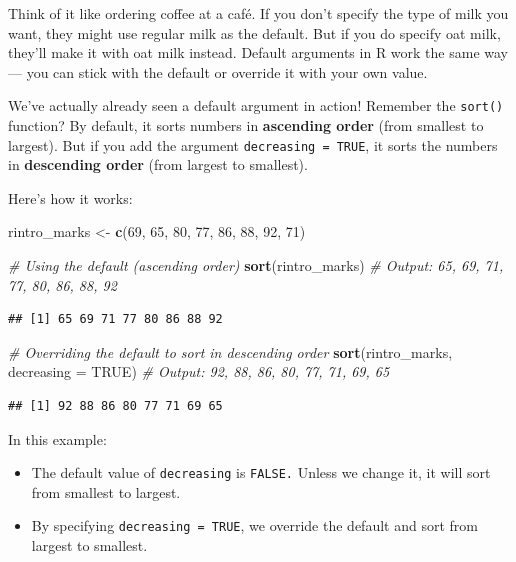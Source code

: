 \documentclass[
]{book}
\newenvironment{Shaded}{\begin{snugshade}}{\end{snugshade}}
\newcommand{\AttributeTok}[1]{\textcolor[rgb]{0.13,0.29,0.53}{#1}}
\newcommand{\CommentTok}[1]{\textcolor[rgb]{0.56,0.35,0.01}{\textit{#1}}}
\newcommand{\ConstantTok}[1]{\textcolor[rgb]{0.56,0.35,0.01}{#1}}
\newcommand{\DecValTok}[1]{\textcolor[rgb]{0.00,0.00,0.81}{#1}}
\newcommand{\FunctionTok}[1]{\textcolor[rgb]{0.13,0.29,0.53}{\textbf{#1}}}
\newcommand{\NormalTok}[1]{#1}
\newcommand{\OtherTok}[1]{\textcolor[rgb]{0.56,0.35,0.01}{#1}}
\begin{document}
Think of it like ordering coffee at a café. If you don't specify the type of milk you want, they might use regular milk as the default. But if you do specify oat milk, they'll make it with oat milk instead. Default arguments in R work the same way --- you can stick with the default or override it with your own value.

We've actually already seen a default argument in action! Remember the \texttt{sort()} function? By default, it sorts numbers in \textbf{ascending order} (from smallest to largest). But if you add the argument \texttt{decreasing\ =\ TRUE}, it sorts the numbers in \textbf{descending order} (from largest to smallest).

Here's how it works:

\begin{Shaded}
\begin{Highlighting}[]
\NormalTok{rintro\_marks }\OtherTok{\textless{}{-}} \FunctionTok{c}\NormalTok{(}\DecValTok{69}\NormalTok{, }\DecValTok{65}\NormalTok{, }\DecValTok{80}\NormalTok{, }\DecValTok{77}\NormalTok{, }\DecValTok{86}\NormalTok{, }\DecValTok{88}\NormalTok{, }\DecValTok{92}\NormalTok{, }\DecValTok{71}\NormalTok{)}

\CommentTok{\# Using the default (ascending order)}
\FunctionTok{sort}\NormalTok{(rintro\_marks)  }\CommentTok{\# Output: 65, 69, 71, 77, 80, 86, 88, 92}
\end{Highlighting}
\end{Shaded}

\begin{verbatim}
## [1] 65 69 71 77 80 86 88 92
\end{verbatim}

\begin{Shaded}
\begin{Highlighting}[]
\CommentTok{\# Overriding the default to sort in descending order}
\FunctionTok{sort}\NormalTok{(rintro\_marks, }\AttributeTok{decreasing =} \ConstantTok{TRUE}\NormalTok{)  }\CommentTok{\# Output: 92, 88, 86, 80, 77, 71, 69, 65}
\end{Highlighting}
\end{Shaded}

\begin{verbatim}
## [1] 92 88 86 80 77 71 69 65
\end{verbatim}

In this example:

\begin{itemize}
\item
  The default value of \texttt{decreasing} is \texttt{FALSE.} Unless we change it, it will sort from smallest to largest.
\item
  By specifying \texttt{decreasing\ =\ TRUE}, we override the default and sort from largest to smallest.
\end{itemize}
\end{document}
